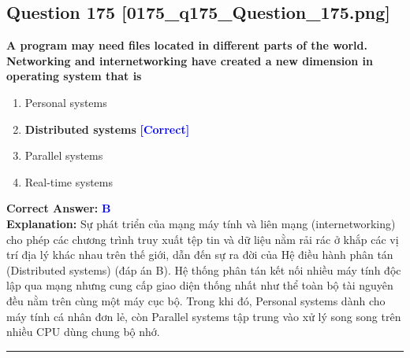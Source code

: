 \documentclass[11pt,a4paper]{article}
\begin{document}
\begin{minipage}{\textwidth}
\subsection*{Question 175 \quad \footnotesize{[0175\_q175\_Question\_175.png]}}
\noindent \textbf{A program may need files located in different parts of the world. Networking and internetworking have created a new dimension in operating system that is}

\begin{enumerate}[label=\Alph*.]
    \item Personal systems
    \item \textbf{Distributed systems} \hfill \textcolor{blue}{\textbf{[Correct]}}
    \item Parallel systems
    \item Real-time systems
\end{enumerate}

\noindent \textbf{Correct Answer:} \textcolor{blue}{\textbf{B}} \\[2pt]
\noindent \textbf{Explanation:} Sự phát triển của mạng máy tính và liên mạng (internetworking) cho phép các chương trình truy xuất tệp tin và dữ liệu nằm rải rác ở khắp các vị trí địa lý khác nhau trên thế giới, dẫn đến sự ra đời của Hệ điều hành phân tán (Distributed systems) (đáp án B). Hệ thống phân tán kết nối nhiều máy tính độc lập qua mạng nhưng cung cấp giao diện thống nhất như thể toàn bộ tài nguyên đều nằm trên cùng một máy cục bộ. Trong khi đó, Personal systems dành cho máy tính cá nhân đơn lẻ, còn Parallel systems tập trung vào xử lý song song trên nhiều CPU dùng chung bộ nhớ.

\par\vspace{0.3cm}
\hrule
\vspace{0.3cm}
\end{minipage}
\end{document}
